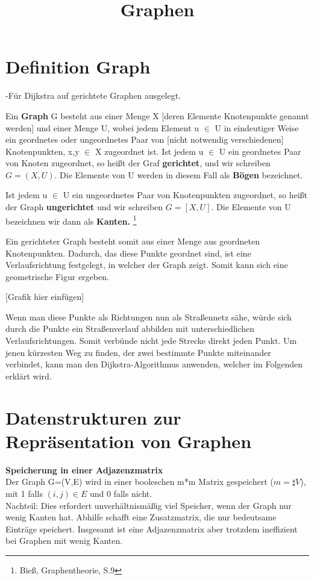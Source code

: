 \documentclass[a4paper,12pt]{article}
\title{Graphen}
\begin{document}
\section{Definition Graph}


-Für Dijkstra auf gerichtete Graphen ausgelegt.

Ein \textbf{Graph} G besteht aus einer Menge X [deren Elemente Knotenpunkte genannt werden] und einer Menge U, wobei jedem Element u $\in$ U in eindeutiger Weise ein geordnetes oder ungeordnetes Paar von [nicht notwendig verschiedenen] Knotenpunkten, x,y $\in$ X zugeordnet ist.
Ist jedem u $\in$ U ein geordnetes Paar von Knoten zugeordnet, so heißt der Graf \textbf{gerichtet}, und wir schreiben 
	$G= (X, U)$.
Die Elemente von U werden in diesem Fall als \textbf{Bögen} bezeichnet.

Ist jedem u $\in$ U ein ungeordnetes Paar von Knotenpunkten zugeordnet, so heißt der Graph \textbf{ungerichtet} und wir schreiben 
	$G=[X,U]$. 
Die Elemente von U bezeichnen wir dann als \textbf{Kanten.}
 \footnote{Bieß, Graphentheorie, S.9}


Ein gerichteter Graph besteht somit aus einer Menge aus geordneten Knotenpunkten. Dadurch, das diese Punkte geordnet sind, ist eine Verlaufsrichtung festgelegt, in welcher der Graph zeigt.
Somit kann sich eine geometrische Figur ergeben.


[Grafik hier einfügen]


Wenn man diese Punkte als Richtungen nun als Straßennetz sähe, würde sich durch die Punkte ein Straßenverlauf abbilden mit unterschiedlichen Verlaufsrichtungen.
Somit verbünde nicht jede Strecke direkt jeden Punkt. Um jenen kürzesten Weg zu finden, der zwei bestimmte Punkte miteinander verbindet, kann man den Dijkstra-Algorithmus anwenden, welcher im Folgenden erklärt wird.



\section{Datenstrukturen zur Repräsentation von Graphen}

\textbf{Speicherung in einer Adjazenzmatrix} \\
Der Graph G=(V,E) wird in einer booleschen m*m Matrix gespeichert ($m = \sharp V$), mit 1 falls $(i,j) \in E$ und 0 falls nicht. \\
Nachteil: Dies erfordert unverhältnismäßig viel Speicher, wenn der Graph nur wenig    	  Kanten hat. Abhilfe schafft eine Zusatzmatrix, die nur bedeutsame Einträge speichert.
 Insgesamt ist eine Adjazenzmatrix aber trotzdem ineffizient bei Graphen mit wenig Kanten. \\
 
\end{document}
